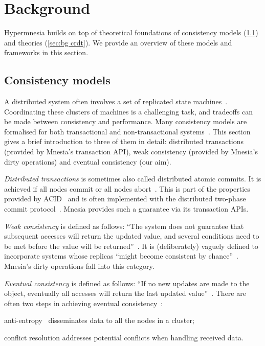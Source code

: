 \section{Background} \label{sec:bg}

Hypermnesia builds on top of theoretical foundations of consistency models
(\cref{sec:bg consistency models}) and  theories (\cref{sec:bg crdt}). 
We provide an overview of these models and frameworks in this section.


\subsection{Consistency models} \label{sec:bg consistency models}

A distributed system often involves a set of replicated state 
machines~\cite{lamport1978clock}. Coordinating these clusters of machines is a 
challenging task, and tradeoffs can be
made between consistency and performance. Many consistency models are formalised for 
both transactional and non-transactional systems~\cite{viotti2016consistency}. 
This section gives a brief
introduction to three of them in detail: distributed transactions (provided by
Mnesia's transaction API), weak consistency (provided by Mnesia's dirty operations)
and eventual consistency (our aim).

\emph{Distributed transactions} is sometimes also called distributed atomic 
commits. It is achieved if all nodes commit
or all nodes abort~\cite{saltzer2009Principles}. This is part of the properties provided by 
ACID~\cite{haerder1983dbtransaction} and
is often implemented with the distributed two-phase commit protocol~\cite{bernstein1987concurrency}.
Mnesia provides such a guarantee via its transaction APIs.

\emph{Weak consistency}
is defined as follows:  
``The system does not guarantee that subsequent accesses will return the updated 
value, and several conditions need to be met before the value will be 
returned''~\cite{vogels2008ec,bermbach2013consistency,viotti2016consistency}.
It is (deliberately) vaguely defined to incorporate systems whose replicas
``might become consistent by chance''~\cite{bermbach2013consistency}. 
Mnesia's dirty operations fall into this category. 

\emph{Eventual consistency} 
is defined as follows: ``If no new updates are made to the object,
eventually all accesses will return the last updated value''~\cite{vogels2008ec}. 
There are often two steps in achieving eventual consistency~\cite{wikipediacontributors2023ec}:
\begin{enumerate*}[(i)]
  \item anti-entropy~\cite{demers1987epidemic} disseminates data to all the nodes 
  in a cluster;
  \item conflict resolution addresses potential conflicts when handling received data.
\end{enumerate*}

